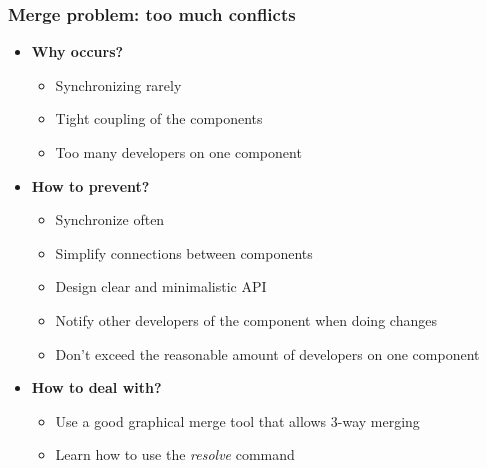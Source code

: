 \documentclass{beamer}
\begin{document}
\begin{frame}
\frametitle{Merge problem: too much conflicts}
\begin{itemize}
\item \textbf{Why occurs?}
\begin{itemize}
\item Synchronizing rarely
\item Tight coupling of the components
\item Too many developers on one component
\end{itemize}
\item \textbf{How to prevent?}
\begin{itemize}
\item Synchronize often
\item Simplify connections between components
\item Design clear and minimalistic API
\item Notify other developers of the component when doing changes
\item Don't exceed the reasonable amount of developers on one component 
\end{itemize}
\item \textbf{How to deal with?}
\begin{itemize}
\item Use a good graphical merge tool that allows 3-way merging
\item Learn how to use the \textit{resolve} command
\end{itemize}
\end{itemize}
\end{frame}
\end{document}
